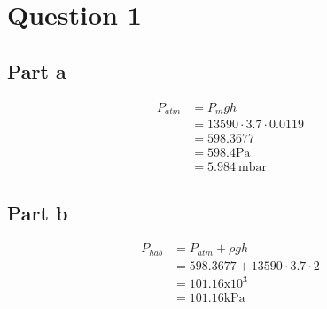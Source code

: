 \section{Question 1}
\subsection{Part a}

\begin{equation*}
\begin{split}
    P_{atm} & = P_{m}gh  \\
        & = 13590  \cdot  3.7  \cdot  0.0119 \\
        & = 598.3677 \\
        & = 598.4 \text{Pa} \\
        & = \SI{5.984}{\milli\bar}
\end{split}
\end{equation*}

\subsection{Part b}

\begin{equation*}
    \begin{split}
        P_{hab} & = P_{atm} + \rho gh \\
                & = 598.3677 + 13590  \cdot  3.7  \cdot  2 \\
                & = 101.16 \text{x} 10^{3} \\
                & = 101.16 \text{kPa}
    \end{split}
\end{equation*}
